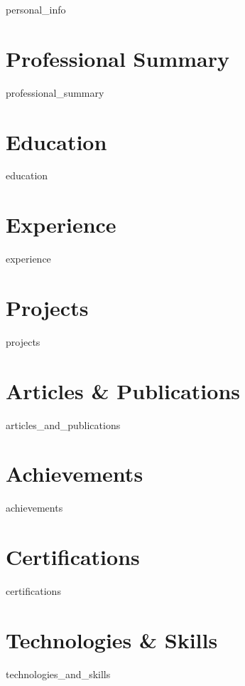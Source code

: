 \documentclass[10pt, letterpaper]{article}
\begin{document}
    {{personal_info}}
    \vspace{0.2cm}

    \section{Professional Summary}
    {{professional_summary}}

    \section{Education}
    {{education}}

    \section{Experience}
    {{experience}}

    \section{Projects}
    {{projects}}

    \section{Articles \& Publications}
    {{articles_and_publications}}

    \section{Achievements}
    {{achievements}}

    \section{Certifications}
    {{certifications}}

    \section{Technologies \& Skills}
    {{technologies_and_skills}}
\end{document}
